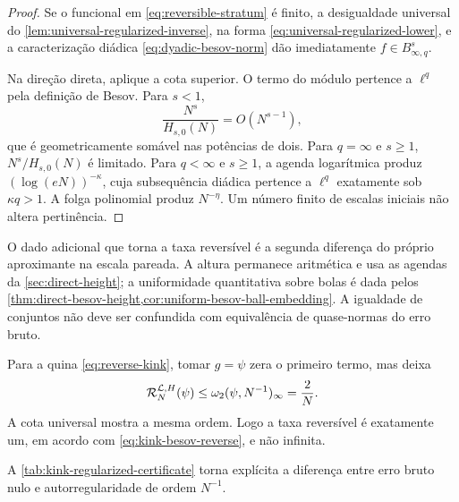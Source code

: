 \begin{proof}
Se o funcional em \eqref{eq:reversible-stratum} é finito, a desigualdade
universal do \cref{lem:universal-regularized-inverse}, na forma
\eqref{eq:universal-regularized-lower}, e a caracterização diádica
\eqref{eq:dyadic-besov-norm} dão imediatamente
$f\in B^s_{\infty,q}$.

Na direção direta, aplique a cota superior. O termo do módulo pertence a
$\ell^q$ pela definição de Besov. Para $s<1$,
\[
 \frac{N^s}{H_{s,0}(N)}=O(N^{s-1}),
\]
que é geometricamente somável nas potências de dois. Para $q=\infty$ e
$s\ge1$, $N^s/H_{s,0}(N)$ é limitado. Para $q<\infty$ e $s\ge1$, a agenda
logarítmica produz $(\log(eN))^{-\kappa}$, cuja subsequência diádica pertence
a $\ell^q$ exatamente sob $\kappa q>1$. A folga polinomial produz
$N^{-\eta}$. Um número finito de escalas iniciais não altera pertinência.
\end{proof}

O dado adicional que torna a taxa reversível é a segunda diferença do próprio
aproximante na escala pareada. A altura permanece aritmética e usa as agendas
da \cref{sec:direct-height}; a uniformidade quantitativa sobre bolas é dada
pelos \cref{thm:direct-besov-height,cor:uniform-besov-ball-embedding}. A igualdade de conjuntos não
deve ser confundida com equivalência de quase-normas do erro bruto.

Para a quina \eqref{eq:reverse-kink}, tomar $g=\psi$ zera o primeiro termo,
mas deixa
\begin{equation}
 \mathcal R_N^{\mathcal{L},H}(\psi)
 \le\omega_2(\psi,N^{-1})_\infty=\frac2N.
 \label{eq:kink-regularized-rate}
\end{equation}
A cota universal mostra a mesma ordem. Logo a taxa reversível é exatamente
um, em acordo com \eqref{eq:kink-besov-reverse}, e não infinita.

\begin{table}[t]
 \centering
 \small
 
 \caption{A quina sob o erro bruto e a parcela de autorregularidade obtida
 com o candidato $g=\psi$. Embora $e_N(\psi)=0$, essa parcela é $2/N$; a
 cota universal \eqref{eq:universal-regularized-lower} garante que o ínfimo
 completo tem a mesma ordem $N^{-1}$.}
 \label{tab:kink-regularized-certificate}
\end{table}

A \cref{tab:kink-regularized-certificate} torna explícita a diferença entre
erro bruto nulo e autorregularidade de ordem $N^{-1}$.

